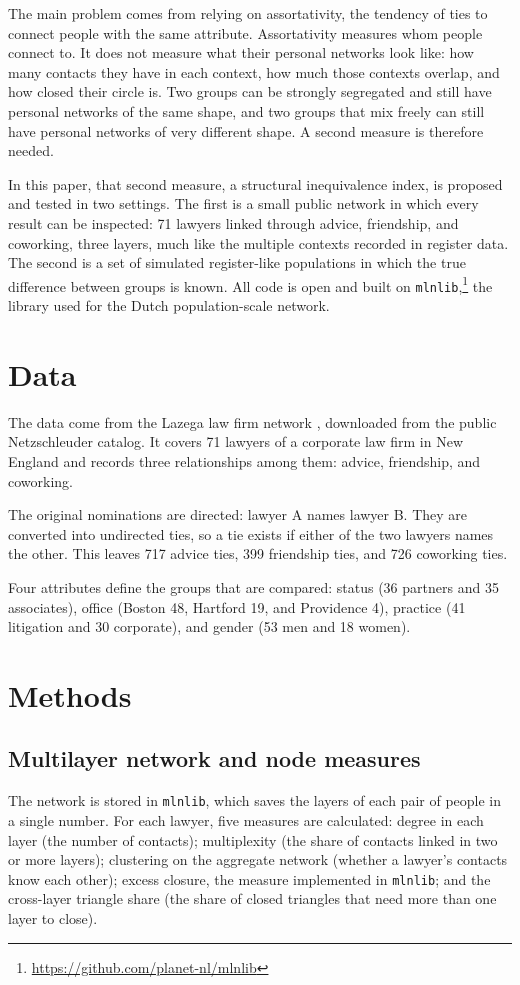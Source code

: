\documentclass[11pt]{article}
\begin{document}
The main problem comes from relying on assortativity, the tendency of ties to connect people with the same attribute. Assortativity measures whom people connect to. It does not measure what their personal networks look like: how many contacts they have in each context, how much those contexts overlap, and how closed their circle is. Two groups can be strongly segregated and still have personal networks of the same shape, and two groups that mix freely can still have personal networks of very different shape. A second measure is therefore needed.

In this paper, that second measure, a structural inequivalence index, is proposed and tested in two settings. The first is a small public network in which every result can be inspected: 71 lawyers linked through advice, friendship, and coworking, three layers, much like the multiple contexts recorded in register data. The second is a set of simulated register-like populations in which the true difference between groups is known. All code is open and built on \texttt{mlnlib},\footnote{\url{https://github.com/planet-nl/mlnlib}} the library used for the Dutch population-scale network.

\section{Data}
The data come from the Lazega law firm network \citep{lazega2001}, downloaded from the public Netzschleuder catalog. It covers 71 lawyers of a corporate law firm in New England and records three relationships among them: advice, friendship, and coworking.

The original nominations are directed: lawyer A names lawyer B. They are converted into undirected ties, so a tie exists if either of the two lawyers names the other. This leaves 717 advice ties, 399 friendship ties, and 726 coworking ties.

Four attributes define the groups that are compared: status (36 partners and 35 associates), office (Boston 48, Hartford 19, and Providence 4), practice (41 litigation and 30 corporate), and gender (53 men and 18 women).

\section{Methods}
\subsection{Multilayer network and node measures}
The network is stored in \texttt{mlnlib}, which saves the layers of each pair of people in a single number. For each lawyer, five measures are calculated: degree in each layer (the number of contacts); multiplexity (the share of contacts linked in two or more layers); clustering on the aggregate network (whether a lawyer's contacts know each other); excess closure, the measure implemented in \texttt{mlnlib}; and the cross-layer triangle share (the share of closed triangles that need more than one layer to close).
\end{document}
